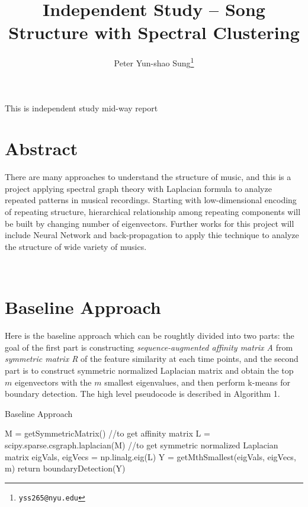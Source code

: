 \documentclass[final]{siamltexmm}
\title{Independent Study -- Song Structure with Spectral Clustering}
\author{Peter Yun-shao Sung\thanks{\tt yss265@nyu.edu} }
\begin{document}
\maketitle

\begin{Note}
This is independent study mid-way report
\end{Note}

\pagestyle{myheadings}
\thispagestyle{plain}

\section{Abstract}
There are many approaches to understand the structure of music, and this is a project applying spectral graph theory with Laplacian formula to analyze repeated patterns in musical recordings. Starting with low-dimensional encoding of repeating structure, hierarchical relationship among repeating components will be built by changing number of eigenvectors. Further works for this project will include Neural Network and back-propagation to apply thie technique to analyze the structure of wide variety of musics.

\\
\section{Baseline Approach}
Here is the baseline approach which can be roughtly divided into two parts: the goal of the first part is constructing \textit{sequence-augmented affinity matrix A} from \textit{symmetric matrix R} of the feature similarity at each time points, and the second part is to construct symmetric normalized Laplacian matrix and obtain the top $m$ eigenvectors with the $m$ smallest eigenvalues, and then perform k-means for boundary detection. The high level pseudocode is described in Algorithm 1.

\begin{algorithm}[htb]
  \caption{Baseline Approach}
  \label{algo:SC}
\begin{algorithmic}[1]
  \STATE M = getSymmetricMatrix() //to get affinity matrix
  \STATE L = scipy.sparse.csgraph.laplacian(M) //to get symmetric normalized Laplacian matrix
  \STATE eigVals, eigVecs = np.linalg.eig(L)
  \STATE Y = getMthSmallest(eigVals, eigVecs, m)
  \STATE return boundaryDetection(Y)
\end{algorithmic}
\end{algorithm}
\end{document}
